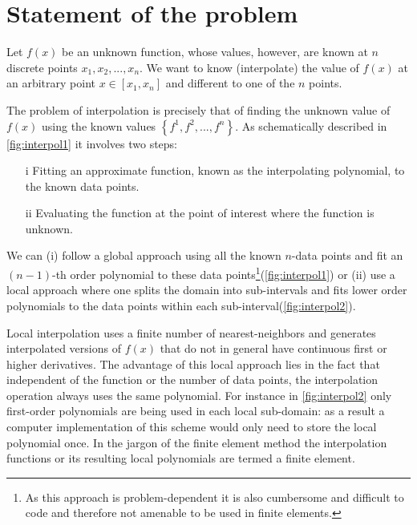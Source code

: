 \section{Statement of the problem}
Let $f(x)$ be an unknown function, whose values, however, are known at $n$ discrete points ${x_1, x_2,...,x_n}$. We want to know (interpolate) the value of $f(x)$ at an arbitrary point $x \in \left[ {{x_1},{x_n}} \right]$ and different to one of the $n$ points.

The problem of interpolation is precisely that of finding the unknown value of $f(x)$ using the known values $\left\{ {{f^1},{f^2},...,{f^n}} \right\}$. As schematically described in \cref{fig:interpol1} it involves two steps:

\begin{itemize}
\item[i]  Fitting an approximate function, known as the interpolating polynomial, to the known data points.
\item[ii] Evaluating the function at the point of interest where the function is unknown.
\end{itemize}

We can (i) follow a global approach using all the known $n$-data points and fit an $(n-1)$-th order polynomial to these data points\footnote{As this approach is problem-dependent it is also cumbersome and difficult to code and therefore not amenable to be used in finite elements.}(\cref{fig:interpol1})  or (ii) use a local approach where one splits the domain into sub-intervals and fits lower order polynomials to the data points within each sub-interval(\cref{fig:interpol2}).

Local interpolation uses a finite number of nearest-neighbors and generates interpolated versions of $f(x)$ that do not in general have continuous first or higher derivatives. The advantage of this local approach lies in the fact that independent of the function or the number of data points, the interpolation operation always uses the same polynomial. For instance in \cref{fig:interpol2} only first-order polynomials are being used in each local sub-domain: as a result a computer implementation of this scheme would only need to store the local polynomial once. In the jargon of the finite element method the interpolation functions or its resulting local polynomials are termed a finite element.



